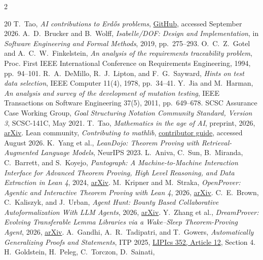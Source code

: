 \documentclass[10pt]{article}
\begin{document}
{\begin{multicols}{2}
\begin{thebibliography}{20}
 T.~Tao, \emph{AI contributions to Erd\H{o}s problems},
\href{https://github.com/teorth/erdosproblems/wiki/AI-contributions-to-Erd%C5%91s-problems}{GitHub},
accessed September 2026.
 A.~D.~Brucker and B.~Wolff, \emph{Isabelle/DOF: Design and
Implementation}, in \emph{Software Engineering and Formal Methods}, 2019,
pp.~275--293.
 O.~C.~Z.~Gotel and A.~C.~W.~Finkelstein, \emph{An analysis
of the requirements traceability problem}, Proc. First IEEE International
Conference on Requirements Engineering, 1994, pp.~94--101.
 R.~A.~DeMillo, R.~J.~Lipton, and F.~G.~Sayward, \emph{Hints
on test data selection}, IEEE Computer 11(4), 1978, pp.~34--41.
 Y.~Jia and M.~Harman, \emph{An analysis and survey of the
development of mutation testing}, IEEE Transactions on Software Engineering
37(5), 2011, pp.~649--678.
 SCSC Assurance Case Working Group, \emph{Goal Structuring
Notation Community Standard, Version 3}, SCSC-141C, May 2021.
 T.~Tao, \emph{Mathematics in the age of AI}, preprint, 2026,
\href{https://doi.org/10.48550/arXiv.2608.16753}{arXiv}.
 Lean community, \emph{Contributing to mathlib},
\href{https://leanprover-community.github.io/contribute/index.html}%
{contributor guide}, accessed August 2026.
 K.~Yang et al., \emph{LeanDojo: Theorem Proving with
Retrieval-Augmented Language Models}, NeurIPS 2023.
 L.~Aniva, C.~Sun, B.~Miranda, C.~Barrett, and S.~Koyejo, \emph{Pantograph: A Machine-to-Machine
Interaction Interface for Advanced Theorem Proving, High Level Reasoning, and
Data Extraction in Lean 4}, 2024,
\href{https://doi.org/10.48550/arXiv.2410.16429}{arXiv}.
 M.~Kripner and M.~Straka, \emph{OpenProver: Agentic and
Interactive Theorem Proving with Lean 4}, 2026,
\href{https://doi.org/10.48550/arXiv.2607.09217}{arXiv}.
 C.~E.~Brown, C.~Kaliszyk, and J.~Urban, \emph{Agent Hunt:
Bounty Based Collaborative Autoformalization With LLM Agents}, 2026,
\href{https://doi.org/10.48550/arXiv.2603.06737}{arXiv}.
 Y.~Zhang et al., \emph{DreamProver: Evolving
Transferable Lemma Libraries via a Wake--Sleep Theorem-Proving Agent}, 2026,
\href{https://doi.org/10.48550/arXiv.2604.26311}{arXiv}.
 A.~Gandhi, A.~R.~Tadipatri, and T.~Gowers,
\emph{Automatically Generalizing Proofs and Statements}, ITP 2025,
\href{https://doi.org/10.4230/LIPIcs.ITP.2025.12}{LIPIcs 352, Article 12}, Section 4.
 H.~Goldstein, H.~Peleg, C.~Torczon, D.~Sainati,

\end{thebibliography}
\end{multicols}}
\end{document}
